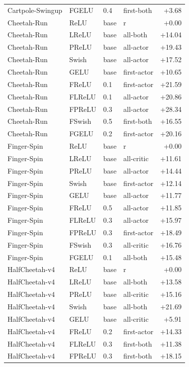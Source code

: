 {\begin{longtable}{llllr}
Cartpole-Swingup & FGELU & 0.4 & first-both & +3.68 \\
Cheetah-Run & ReLU & base & r & +0.00 \\
Cheetah-Run & LReLU & base & all-both & +14.04 \\
Cheetah-Run & PReLU & base & all-actor & +19.43 \\
Cheetah-Run & Swish & base & all-actor & +17.52 \\
Cheetah-Run & GELU & base & first-actor & +10.65 \\
Cheetah-Run & FReLU & 0.1 & first-actor & +21.59 \\
Cheetah-Run & FLReLU & 0.1 & all-actor & +20.86 \\
Cheetah-Run & FPReLU & 0.3 & all-actor & +28.34 \\
Cheetah-Run & FSwish & 0.5 & first-both & +16.55 \\
Cheetah-Run & FGELU & 0.2 & first-actor & +20.16 \\
Finger-Spin & ReLU & base & r & +0.00 \\
Finger-Spin & LReLU & base & all-critic & +11.61 \\
Finger-Spin & PReLU & base & all-actor & +14.44 \\
Finger-Spin & Swish & base & first-actor & +12.14 \\
Finger-Spin & GELU & base & all-actor & +11.77 \\
Finger-Spin & FReLU & 0.5 & all-actor & +11.85 \\
Finger-Spin & FLReLU & 0.3 & all-actor & +15.97 \\
Finger-Spin & FPReLU & 0.3 & first-actor & +18.49 \\
Finger-Spin & FSwish & 0.3 & all-critic & +16.76 \\
Finger-Spin & FGELU & 0.1 & all-both & +15.48 \\
HalfCheetah-v4 & ReLU & base & r & +0.00 \\
HalfCheetah-v4 & LReLU & base & all-both & +13.58 \\
HalfCheetah-v4 & PReLU & base & all-critic & +15.16 \\
HalfCheetah-v4 & Swish & base & all-both & +21.69 \\
HalfCheetah-v4 & GELU & base & all-critic & +5.91 \\
HalfCheetah-v4 & FReLU & 0.2 & first-actor & +14.33 \\
HalfCheetah-v4 & FLReLU & 0.3 & first-both & +11.38 \\
HalfCheetah-v4 & FPReLU & 0.3 & first-both & +18.15 \\

\end{longtable}}

